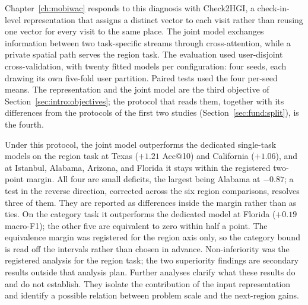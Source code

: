 Chapter~\ref{ch:mobiwac} responds to this diagnosis with Check2HGI, a check-in-level
representation that assigns a distinct vector to each visit rather than reusing one
vector for every visit to the same place. The joint model exchanges information between
two task-specific streams through cross-attention, while a private spatial path serves
the region task. The evaluation used user-disjoint cross-validation, with twenty fitted
models per configuration: four seeds, each drawing its own five-fold user partition.
Paired tests used the four per-seed means. The representation and the joint model are
the third objective of Section~\ref{sec:intro:objectives}; the protocol that reads them,
together with its differences from the protocols of the first two studies
(Section~\ref{sec:fund:split}), is the fourth.

Under this protocol, the joint model outperforms the dedicated single-task models on the
region task at Texas ($+1.21$ Acc@10) and California ($+1.06$), and at Istanbul, Alabama,
Arizona, and Florida it stays within the registered two-point margin. All four are small
deficits, the largest being Alabama at $-0.87$; a test in the reverse direction, corrected across
the six region comparisons, resolves three of them. They are reported as differences inside the
margin rather than as ties. On
the category task it outperforms the dedicated model at Florida ($+0.19$ macro-F1); the
other five are equivalent to zero within half a point. The equivalence margin was registered for
the region axis only, so the category bound is read off the intervals rather than chosen in advance.
Non-inferiority was the registered analysis for the region task; the
two superiority findings are secondary results outside that analysis plan. Further analyses
clarify what these results do and do not establish. They isolate the contribution of the
input representation and identify a possible relation between problem scale and the next-region
gains.

